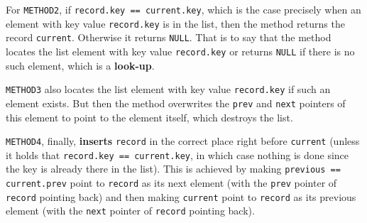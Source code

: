 \documentclass{jn-pset}
\begin{document}
\begin{problem}
\begin{solution}
  For
  \verb+METHOD2+,
  if
  \verb+record.key == current.key+,
  which is the case precisely when an element with key value
  \verb+record.key+
  is in the list,
  then the method  returns the record
  \verb+current+.
  Otherwise it returns 
  \verb+NULL+.
  That is to say that the method locates the list element with key value
  \verb+record.key+
  or returns
  \verb+NULL+
  if there is no such element, which is a \textbf{look-up}.
  
  \verb+METHOD3+
  also locates the list element with key value
  \verb+record.key+
  if such an element exists.
  But then the method overwrites the
  \verb+prev+
  and
  \verb+next+
  pointers of this element to point to the element itself,
  which destroys the list.
  
  \verb+METHOD4+,
  finally, \textbf{inserts}
  \verb+record+
  in the correct place right before
  \verb+current+
  (unless it holds that 
  \verb+record.key == current.key+,
  in which case nothing is done since the key is already there in the
  list).
  This is achieved by making 
  \verb+previous == current.prev+
  point to \verb+record+ as its next element
  (with the \verb+prev+ pointer of \verb+record+ pointing back)
  and then making
  \verb+current+
  point to 
  \verb+record+
  as its previous element
  (with the
  \verb+next+ pointer of
  \verb+record+ pointing back).
\end{solution}

\end{problem}


\end{document}
